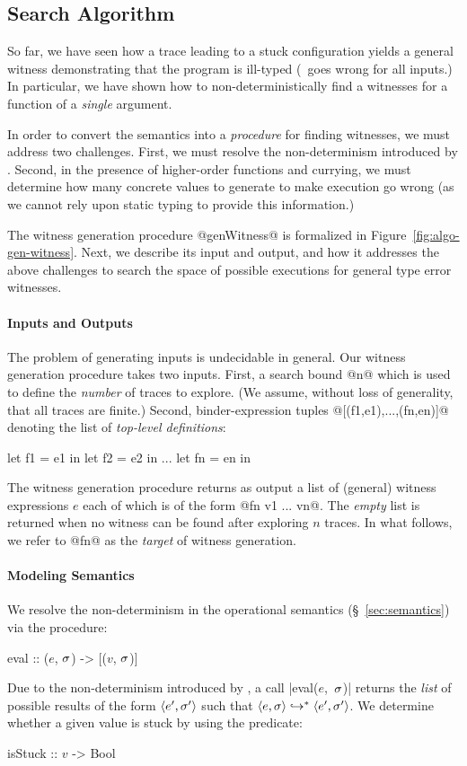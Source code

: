 \subsection{Search Algorithm}
\label{sec:search-algorithm}
%
So far, we have seen how a trace leading to a stuck configuration yields
a general witness demonstrating that the program is ill-typed (\ie\ goes
wrong for all inputs.)
In particular, we have shown how to non-deterministically find a witnesses
for a function of a \emph{single} argument.

In order to convert the semantics into a \emph{procedure} for finding
witnesses, we must address two challenges.
%
First, we must resolve the non-determinism introduced by \gensym.
%
Second, in the presence of higher-order functions and currying,
we must determine how many concrete values to generate to make
execution go wrong (as we cannot rely upon static typing to
provide this information.)

The witness generation procedure @genWitness@ is formalized in
Figure~\ref{fig:algo-gen-witness}.
%
Next, we describe its input and output, and how it
addresses the above challenges to search the space of possible
executions for general type error witnesses.

\paragraph{Inputs and Outputs}
%
The problem of generating inputs is undecidable in general.
%
Our witness generation procedure takes two inputs.
%
First, a search bound @n@ which is used to define the \emph{number} of
traces to explore. (We assume, without loss of generality, that all
traces are finite.)
%
Second, binder-expression tuples @[(f1,e1),...,(fn,en)]@
denoting the list of \emph{top-level definitions}:
%
\begin{code}
  let f1 = e1 in
  let f2 = e2 in
  ...
  let fn = en in
\end{code}
%
The witness generation procedure returns as output a list of (general)
witness expressions $e$ each of which is of the form @fn v1 ... vn@.
%
The \emph{empty} list is returned when no witness can be found after
exploring $n$ traces.
%
In what follows, we refer to @fn@ as the \emph{target} of witness generation.

\paragraph{Modeling Semantics}
%
We resolve the non-determinism in the operational semantics
(\S~\ref{sec:semantics}) via the procedure:
%
\begin{mcode}
  eval :: ($e$, $\sigma$) -> [($v$, $\sigma$)]
\end{mcode}
%
Due to the non-determinism introduced by \gensym, a call \hbox{|eval($e$, $\sigma$)|}
returns the \emph{list} of possible results of the form $\langle e', \sigma' \rangle$ such
that $\langle e, \sigma \rangle \hookrightarrow^{*} \langle e', \sigma' \rangle$.
%
We determine whether a given value is stuck by using the predicate:
%
\begin{mcode}
  isStuck :: $v$ -> Bool
\end{mcode}

